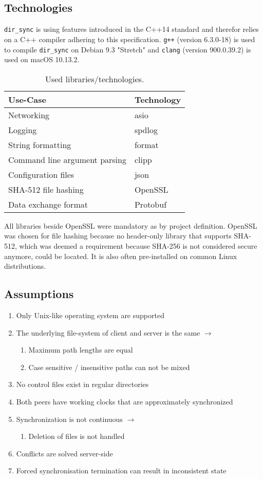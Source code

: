 \documentclass[a4paper]{article}
\begin{document}
\subsection{Technologies}
\texttt{dir\_sync} is using features introduced in the C++14 standard and therefor relies on a C++ compiler adhering to this specification. \texttt{g++} (version 6.3.0-18) is used to compile \texttt{dir\_sync} on Debian 9.3 "Stretch" and \texttt{clang} (version 900.0.39.2) is used on macOS 10.13.2.

\begin{table}[h]
\centering
\begin{tabular}{l|l}
Use-Case                      & Technology \\ \hline
Networking                    & asio       \\
Logging                       & spdlog     \\
String formatting             & format     \\
Command line argument parsing & clipp      \\
Configuration files           & json       \\
SHA-512 file hashing          & OpenSSL    \\
Data exchange format          & Protobuf  
\end{tabular}
\caption{Used libraries/technologies.}
\end{table}

All libraries beside OpenSSL were mandatory as by project definition. 
OpenSSL was chosen for file hashing because no header-only library that supports SHA-512, which was deemed a requirement because SHA-256 is not considered secure anymore, could be located. It is also often pre-installed on common Linux distributions. 

\subsection{Assumptions}
\begin{enumerate}
\item Only Unix-like operating system are supported 
\item The underlying file-system of client and server is the same $\rightarrow$
\begin{enumerate}
	\item Maximum path lengths are equal
	\item Case sensitive / insensitive paths can not be mixed
\end{enumerate}
\item No control files exist in regular directories
\item Both peers have working clocks that are approximately synchronized
\item Synchronization is not continuous $\rightarrow$
\begin{enumerate}
	\item Deletion of files is not handled
\end{enumerate}
\item Conflicts are solved server-side
\item Forced synchronisation termination can result in inconsistent state
\end{enumerate}
\end{document}
